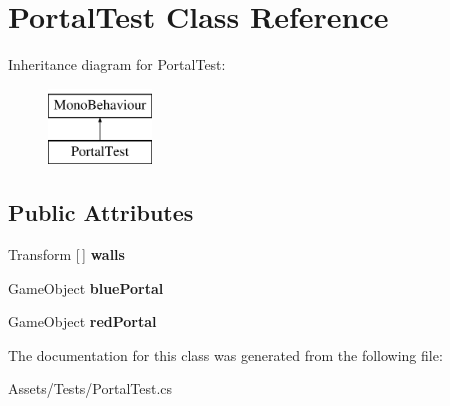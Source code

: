 \hypertarget{class_portal_test}{}\section{Portal\+Test Class Reference}
\label{class_portal_test}
Inheritance diagram for Portal\+Test\+:\begin{figure}[H]
\begin{center}
\leavevmode
\includegraphics[height=2.000000cm]{class_portal_test}
\end{center}
\end{figure}
\subsection*{Public Attributes}
\begin{DoxyCompactItemize}
\item 
\mbox{\label{class_portal_test_a3bb2fcfb4bc0b38bb5ec49c2d3586e87}} 
Transform \mbox{[}$\,$\mbox{]} {\bfseries walls}
\item 
\mbox{\label{class_portal_test_a01b2cbe009213d60c6dc70da945a5883}} 
Game\+Object {\bfseries blue\+Portal}
\item 
\mbox{\label{class_portal_test_ac754b61f5de15b64f9b122be1d771fd9}} 
Game\+Object {\bfseries red\+Portal}
\end{DoxyCompactItemize}


The documentation for this class was generated from the following file\+:\begin{DoxyCompactItemize}
\item 
Assets/\+Tests/Portal\+Test.\+cs\end{DoxyCompactItemize}
